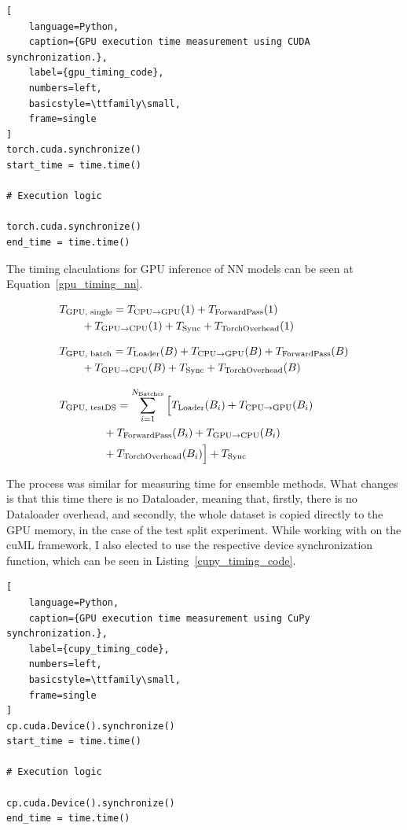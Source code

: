 \begin{lstlisting}[
    language=Python,
    caption={GPU execution time measurement using CUDA synchronization.},
    label={gpu_timing_code},
    numbers=left,
    basicstyle=\ttfamily\small,
    frame=single
]
torch.cuda.synchronize()
start_time = time.time()

# Execution logic

torch.cuda.synchronize()
end_time = time.time()
\end{lstlisting}

The timing claculations for GPU inference of NN models can be seen at Equation~\ref{gpu_timing_nn}.

\begin{subequations}\label{gpu_timing_nn}
\renewcommand{\theequation}{\theparentequation.\arabic{equation}}
\begin{align}
&T_{\text{GPU, single}} =
T_{\text{CPU}\rightarrow\text{GPU}}(1) +
T_{\text{ForwardPass}}(1)
\notag\\
&\qquad+
T_{\text{GPU}\rightarrow\text{CPU}}(1) +
T_{\text{Sync}} +
T_{\text{TorchOverhead}}(1)
\label{eq:gpu_single}\\[8pt]
&T_{\text{GPU, batch}} =
T_{\text{Loader}}(B) +
T_{\text{CPU}\rightarrow\text{GPU}}(B) +
T_{\text{ForwardPass}}(B)
\notag\\
&\qquad+
T_{\text{GPU}\rightarrow\text{CPU}}(B) +
T_{\text{Sync}} +
T_{\text{TorchOverhead}}(B)
\label{eq:gpu_batch}\\[8pt]
&T_{\text{GPU, testDS}} =
\sum_{i=1}^{N_{\text{Batches}}}
\Big[
T_{\text{Loader}}(B_i) +
T_{\text{CPU}\rightarrow\text{GPU}}(B_i)
\notag\\
&\qquad\qquad+
T_{\text{ForwardPass}}(B_i) +
T_{\text{GPU}\rightarrow\text{CPU}}(B_i)
\notag\\
&\qquad\qquad+
T_{\text{TorchOverhead}}(B_i)
\Big] + T_{\text{Sync}}
\label{eq:gpu_test}
\end{align}
\end{subequations}

The process was similar for measuring time for ensemble methods. What changes is that this time there is no Dataloader, meaning that, firstly, there is no Dataloader overhead, and secondly, the whole dataset is copied directly to the GPU memory, in the case of the test split experiment. While working with on the cuML framework, I also elected to use the respective device synchronization function, which can be seen in Listing~\ref{cupy_timing_code}.

\begin{lstlisting}[
    language=Python,
    caption={GPU execution time measurement using CuPy synchronization.},
    label={cupy_timing_code},
    numbers=left,
    basicstyle=\ttfamily\small,
    frame=single
]
cp.cuda.Device().synchronize()
start_time = time.time()

# Execution logic

cp.cuda.Device().synchronize()
end_time = time.time()
\end{lstlisting}

